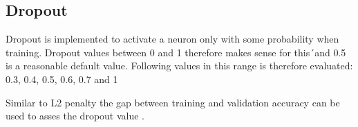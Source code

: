 \subsection{Dropout}
Dropout is implemented to activate a neuron only with some probability when training. Dropout values between 0 and 1 therefore makes sense for this´and 0.5 is a reasonable default value\citep{NN3}. Following values in this range is therefore evaluated: 0.3, 0.4, 0.5, 0.6, 0.7 and 1

Similar to L2 penalty the gap between training and validation accuracy can be used to asses the dropout value \citep{NN3}. 





